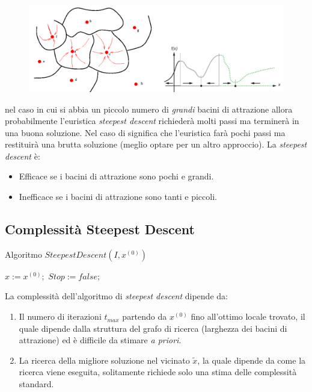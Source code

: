 \documentclass{article}
\begin{document}
\begin{figure}[h]
    \centering
    \includegraphics[scale=0.3]{images/attr_basins.png}
\end{figure}

nel caso in cui si abbia un piccolo numero di \textit{grandi} bacini di attrazione allora probabilmente
l'euristica \textit{steepest descent} richiederà molti passi ma terminerà in una buona soluzione. Nel
caso di significa che l'euristica farà pochi passi ma restituirà una brutta soluzione (meglio optare
per un altro approccio).
La \textit{steepest descent} è:
\begin{itemize}
    \item Efficace se i bacini di attrazione sono pochi e grandi.
    \item Inefficace se i bacini di attrazione sono tanti e piccoli.
\end{itemize}

\subsection{Complessità Steepest Descent}
\begin{algorithm}[H]
    \caption{Algoritmo $SteepestDescent(I,x^{(0)})$}
    \label{alg:steepest_des0}
    \begin{algorithmic}
        \State $x:=x^{(0)};$
        \State $Stop := false;$
        \Else
        \EndIf
        \EndWhile
    \end{algorithmic}
\end{algorithm}
La complessità dell'algoritmo di \textit{steepest descent} dipende da:
\begin{enumerate}
    \item Il numero di iterazioni $t_{max}$ partendo da $x^{(0)}$ fino all'ottimo locale trovato,
    il quale dipende dalla struttura del grafo di ricerca (larghezza dei bacini di attrazione)
    ed è difficile da stimare \textit{a priori}.

    \item La ricerca della migliore soluzione nel vicinato $\tilde{x}$, la quale dipende da come la
    ricerca viene eseguita, solitamente richiede solo una stima delle complessità standard.
\end{enumerate}
\end{document}
